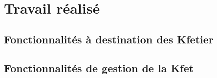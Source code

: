\documentclass{polytech-presentation}
\newcommand{\beamerannot}[1]{
    \note{#1}
}
\begin{document}
        \section<presentation>{Travail réalisé}%

            \subsection<presentation>{Fonctionnalités à destination des Kfetier}%
                \begin{frame}
                    \begin{block}{}

                    \end{block}
                    \beamerannot{}
                \end{frame}

            \subsection<presentation>{Fonctionnalités de gestion de la Kfet}%
                \begin{frame}
                    \begin{block}{}

                    \end{block}
                    \beamerannot{}
                \end{frame}%
\end{document}
